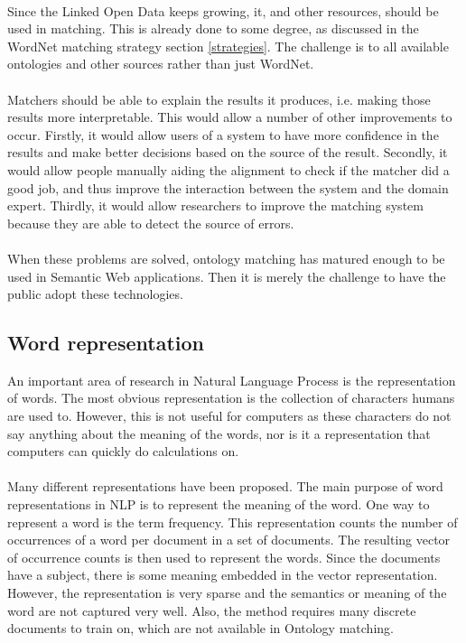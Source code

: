 \documentclass{article}
\begin{document}
 \paragraph{}
 Since the Linked Open Data keeps growing, it, and other resources, should be used in matching. This is already done to some degree, as discussed in the WordNet matching strategy section \ref{strategies}. The challenge is to all available ontologies and other sources rather than just WordNet.
 \paragraph{}
 Matchers should be able to explain the results it produces, i.e. making those results more interpretable. This would allow a number of other improvements to occur. Firstly, it would allow users of a system to have more confidence in the results and make better decisions based on the source of the result. Secondly, it would allow people manually aiding the alignment to check if the matcher did a good job, and thus improve the interaction between the system and the domain expert. Thirdly, it would allow researchers to improve the matching system because they are able to detect the source of errors.
 \paragraph{}
 When these problems are solved, ontology matching has matured enough to be used in Semantic Web applications. Then it is merely the challenge to have the public adopt these technologies.
 
 \subsection{Word representation} \label{w2v}
 An important area of research in Natural Language Process is the representation of words. The most obvious representation is the collection of characters humans are used to. However, this is not useful for computers as these characters do not say anything about the meaning of the words, nor is it a representation that computers can quickly do calculations on.
 \paragraph{}
 Many different representations have been proposed. The main purpose of word representations in NLP is to represent the meaning of the word. One way to represent a word is the term frequency. This representation counts the number of occurrences of a word per document in a set of documents. The resulting vector of occurrence counts is then used to represent the words. Since the documents have a subject, there is some meaning embedded in the vector representation. However, the representation is very sparse and the semantics or meaning of the word are not captured very well. Also, the method requires many discrete documents to train on, which are not available in Ontology matching.
\end{document}
